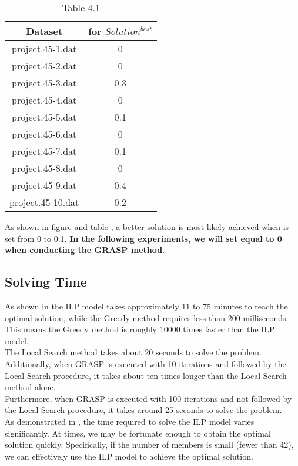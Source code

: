 \documentclass{article}
\begin{document}
\begin{table}[H]
\centering
\begin{tabular}{||c c||} 
 \hline
 Dataset & \bm{$\alpha$} for $Solution^{best}$ \\ [0.5ex] 
 \hline\hline
project.45-1.dat & 0  \\ 
project.45-2.dat & 0  \\
project.45-3.dat & 0.3  \\
project.45-4.dat & 0  \\
project.45-5.dat & 0.1  \\
project.45-6.dat & 0  \\
project.45-7.dat & 0.1  \\
project.45-8.dat & 0  \\
project.45-9.dat & 0.4  \\
project.45-10.dat & 0.2  \\ [1ex] 
 \hline
\end{tabular}
\captionsetup{labelformat=empty}
\caption{Table 4.1}
\label{table41}
\end{table}

\noindent As shown in figure  and table , a better solution is most likely achieved when \bm{$\alpha$} is set from 0 to 0.1. \textbf{In the following experiments, we will set \bm{$\alpha$} equal to 0 when conducting the GRASP method}.


\subsection{Solving Time}

As shown in  the ILP model takes approximately 11 to 75 minutes to reach the optimal solution, while the Greedy method requires less than 200 milliseconds. This means the Greedy method is roughly 10000 times faster than the ILP model. \\
The Local Search method takes about 20 seconds to solve the problem.
Additionally, when GRASP is executed with 10 iterations and followed by the Local Search procedure, it takes about ten times longer than the Local Search method alone. \\
Furthermore, when GRASP is executed with 100 iterations and not followed by the Local Search procedure, it takes around 25 seconds to solve the problem.\\
As demonstrated in , the time required to solve the ILP model varies significantly. At times, we may be fortunate enough to obtain the optimal solution quickly. Specifically, if the number of members is small (fewer than 42), we can effectively use the ILP model to achieve the optimal solution.
\end{document}
